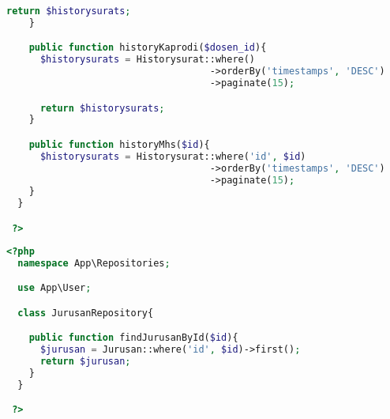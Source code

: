 \begin{lstlisting}[language=php, caption=HistorysuratRepository.php]
      return $historysurats;
    }

    public function historyKaprodi($dosen_id){
      $historysurats = Historysurat::where()
                                    ->orderBy('timestamps', 'DESC')
                                    ->paginate(15);

      return $historysurats;
    }

    public function historyMhs($id){
      $historysurats = Historysurat::where('id', $id)
                                    ->orderBy('timestamps', 'DESC')
                                    ->paginate(15);
    }
  }

 ?>

\end{lstlisting}

\begin{lstlisting}[language=php, caption=JurusanRepository.php]
	<?php
  namespace App\Repositories;

  use App\User;

  class JurusanRepository{

    public function findJurusanById($id){
      $jurusan = Jurusan::where('id', $id)->first();
      return $jurusan;
    }
  }

 ?>

\end{lstlisting}

